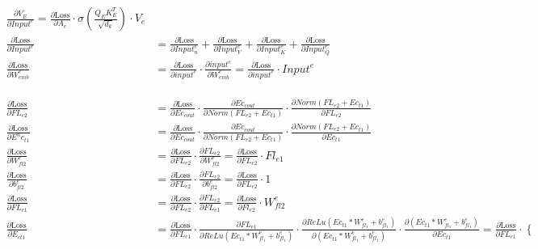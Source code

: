 \documentclass[12pt,letterpaper]{article}
\begin{document}
\begin{align*}
\frac{\partial V_{E}}{\partial Input^{e}}=
\frac{\partial \text{Loss}}{\partial A_{e}}\cdot
\sigma\left(\frac{Q_{E} K_{E}^T}{\sqrt{d_k}}\right)
\cdot V_e
\\
\frac{\partial \text{Loss}}{\partial Input^{e}} &= %
\frac{\partial \text{Loss}}{\partial Input^{e}_n}+
\frac{\partial \text{Loss}}{\partial Input^{e}_V}+
\frac{\partial \text{Loss}}{\partial Input^{e}_K}+
\frac{\partial \text{Loss}}{\partial Input^{e}_Q}
\\
\frac{\partial \text{Loss}}{\partial W^e_{emb}} &= %
\frac{\partial \text{Loss}}{\partial input^e} \cdot
\frac{\partial input^e}{\partial W^e_{emb}}=
\frac{\partial \text{Loss}}{\partial input^e} \cdot
Input^e
\\
\\\\\\
\frac{\partial \text{Loss}}{\partial FL_{e2}} &= %
\frac{\partial \text{Loss}}{\partial Ec_{cout}}\cdot
\frac{\partial Ec_{cout}}{\partial Norm(FL_{e2}+Ec_{t1})}\cdot
\frac{\partial Norm(FL_{e2}+Ec_{t1})}{\partial FL_{e2}}
\\
\frac{\partial \text{Loss}}{\partial E^{n}c_{t1}} &= %
\frac{\partial \text{Loss}}{\partial Ec_{cout}}\cdot
\frac{\partial Ec_{cout}}{\partial Norm(FL_{e2}+Ec_{t1})}\cdot
\frac{\partial Norm(FL_{e2}+Ec_{t1})}{\partial Ec_{t1}}
\\
\frac{\partial \text{Loss}}{\partial W^e_{fl2}} &= %
\frac{\partial \text{Loss}}{\partial FL_{e2}}\cdot
\frac{\partial FL_{e2}}{\partial W^e_{fl2}}=
\frac{\partial \text{Loss}}{\partial FL_{e2}}\cdot Fl_{e1}
\\
\frac{\partial \text{Loss}}{\partial b^e_{fl2}} &= %
\frac{\partial \text{Loss}}{\partial FL_{e2}}\cdot
\frac{\partial FL_{e2}}{\partial b^e_{fl2}}=
\frac{\partial \text{Loss}}{\partial FL_{e2}}\cdot 1
\\ 
\frac{\partial \text{Loss}}{\partial FL_{e1}} &= %
\frac{\partial \text{Loss}}{\partial FL_{e2}}\cdot
\frac{\partial FL_{e2}}{\partial FL_{e1}}=
\frac{\partial \text{Loss}}{\partial Fl_{e2}}\cdot W^e_{fl2}
\\
\frac{\partial \text{Loss}}{\partial E_{ct1}} &= %
\frac{\partial \text{Loss}}{\partial FL_{e1}} \cdot
\frac{\partial FL_{e1}}{\partial ReLu(Ec_{t1}*W^e_{fl_1}+b^e_{fl_1})} \cdot
\frac{\partial ReLu(Ec_{t1}*W^e_{fl_1}+b^e_{fl_1})}{\partial (Ec_{t1}*W^e_{fl_1}+b^e_{fl_1})} \cdot
\frac{\partial (Ec_{t1}*W^e_{fl_1}+b^e_{fl_1})}{\partial Ec_{t1}}=
\frac{\partial \text{Loss}}{\partial FL_{e1}} \cdot \begin{cases}

\end{cases}
\end{align*}
\end{document}
